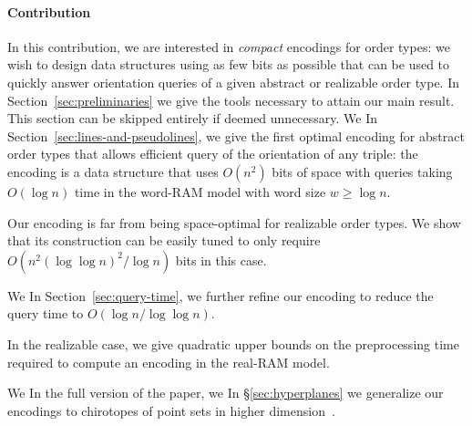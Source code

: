 


\paragraph{Contribution}

In this contribution, we are interested in \emph{compact} encodings for
order types: we wish to design data structures using as few bits as possible
that can be used to quickly answer orientation queries of a given abstract or
realizable order type.
\ifeurocg%
\DefinitionEncoding*
\fi%
%
\ifjournal%
	In Section~\ref{sec:preliminaries} we give the tools necessary to
	attain our main result. This section can be skipped entirely if deemed
	unnecessary.
\fi%
\ifeurocg%
We \else%
In Section~\ref{sec:lines-and-pseudolines}, we \fi%
give the first optimal encoding for abstract
order types that allows efficient query of the orientation of any triple: the
encoding is a data structure that uses \( O(n^2) \) bits of space with queries
taking \(O(\log n)\) time in the word-RAM model with word size \(w \geq \log
n\).
\ifeurocg%

\fi%
%
Our encoding is far from being space-optimal for realizable order types.
We show that its construction can be easily tuned to only require \(O(n^2
{(\log{\log{n}})}^2 / \log{n})\) bits in this case.
\ifeurocg%

\fi%
%
\ifeurocg%
We \else%
In Section~\ref{sec:query-time}, we \fi%
further refine our encoding to
reduce the query time to \(O(\log{n}/\log{\log{n}})\).
\ifeurocg%


\fi%
%
In the realizable case, we give quadratic upper bounds on the
preprocessing time required to compute an encoding in the real-RAM model.
\ifeurocg%

\fi%
%
\ifeurocg%
We \else\ifsocg%
In the full version of the paper, we \else%
In \S\ref{sec:hyperplanes} we \fi\fi%
generalize our encodings to chirotopes of
point sets in higher dimension\ifsocg~\cite{CCILO18}\fi.
\ifeurocg%

\fi%
\ifeurocg%

\fi%
